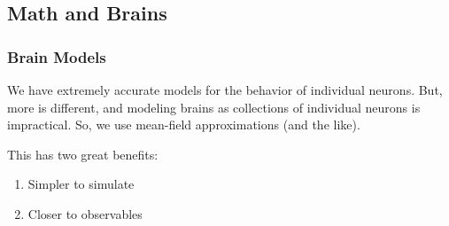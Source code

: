 \documentclass[hyperref={hidelinks}]{beamer}
\begin{document}
\subsection{Math and Brains}
\begin{frame}
  \frametitle{Brain Models}
  We have extremely accurate models for the behavior of individual neurons.
  But, more is different, and modeling brains as collections of individual neurons is impractical.
  So, we use mean-field approximations (and the like).

  This has two great benefits: %
  \begin{enumerate}
  \item Simpler to simulate

  \item Closer to observables

  \end{enumerate}

\end{frame}
\end{document}
